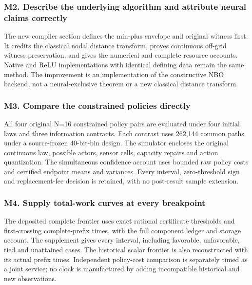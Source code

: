 \documentclass[ecta,nameyear,draft]{econsocart}
\begin{document}
\hypertarget{m2-describe-the-underlying-algorithm-and-attribute-neural-claims-correctly}{%
\subsubsection{M2. Describe the underlying algorithm and attribute
neural claims
correctly}\label{m2-describe-the-underlying-algorithm-and-attribute-neural-claims-correctly}}

The new compiler section defines the min-plus envelope and original
witness first. It credits the classical nodal distance transform, proves
continuous off-grid witness preservation, and gives the numerical and
complete resource accounts. Native and ReLU implementations with
identical defining data remain the same method. The improvement is an
implementation of the constructive NBO backend, not a neural-exclusive
theorem or a new classical distance transform.

\hypertarget{m3-compare-the-constrained-policies-directly}{%
\subsubsection{M3. Compare the constrained policies
directly}\label{m3-compare-the-constrained-policies-directly}}

All four original N=16 constrained policy pairs are evaluated under four
initial laws and three information contracts. Each contrast uses 262,144
common paths under a source-frozen 40-bit-bin design. The simulator
encloses the original continuous law, possible actors, sensor cells,
capacity repairs and action quantization. The simultaneous confidence
account uses bounded raw policy costs and certified endpoint means and
variances. Every interval, zero-threshold sign and replacement-fee
decision is retained, with no post-result sample extension.

\hypertarget{m4-supply-total-work-curves-at-every-breakpoint}{%
\subsubsection{M4. Supply total-work curves at every
breakpoint}\label{m4-supply-total-work-curves-at-every-breakpoint}}

The deposited complete frontier uses exact rational certificate
thresholds and first-crossing complete-prefix times, with the full
component ledger and storage account. The supplement gives every
interval, including favorable, unfavorable, tied and unattained cases.
The historical scalar frontier is also reconstructed with its actual
prefix times. Independent policy-cost comparison is separately timed as
a joint service; no clock is manufactured by adding incompatible
historical and new observations.
\end{document}
